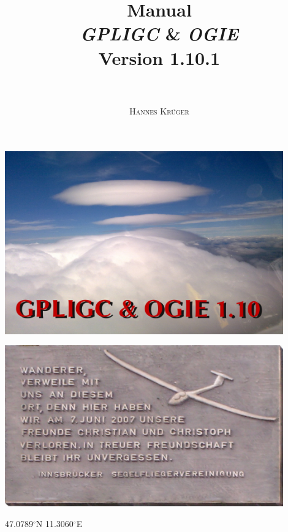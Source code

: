 \documentclass[a4paper,10pt]{article}
\title{
{\huge \textbf{Manual}}\\
\emph{GPLIGC} \& \emph{OGIE}\\
{\small Version 1.10.1}\\
~\\
}
\author{\textsc{Hannes Kr\"uger}}
\begin{document}
\maketitle
\begin{center}
\includegraphics[width=12cm]{jpg/logo}
\end{center}

\newpage

\thispagestyle{empty}
\begin{center}
\includegraphics[width=12cm]{png/CC}
\end{center}
47.0789$^\circ$N 11.3060$^\circ$E

\newpage
\tableofcontents
\sloppy





%       
%       
%       






\begin{appendix}






%



\end{appendix}




\end{document}
